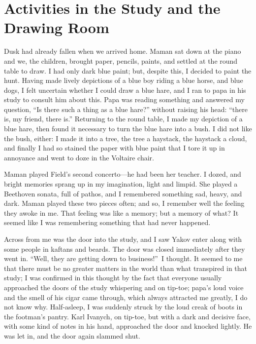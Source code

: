 \chapter{Activities in the Study and the Drawing Room} %

Dusk had already fallen when we arrived home. Maman sat down at the piano and we, the children, brought paper, pencils, paints, and settled at the round table to draw. I had only dark blue paint; but, despite this, I decided to paint the hunt. Having made lively depictions of a blue boy riding a blue horse, and blue dogs, I felt uncertain whether I could draw a blue hare, and I ran to papa in his study to consult him about this. Papa was reading something and answered my question, ``Is there such a thing as a blue hare?'' without raising his head: ``there is, my friend, there is.'' Returning to the round table, I made my depiction of a blue hare, then found it necessary to turn the blue hare into a bush. I did not like the bush, either: I made it into a tree, the tree a haystack, the haystack a cloud, and finally I had so stained the paper with blue paint that I tore it up in annoyance and went to doze in the Voltaire chair.

Maman played Field's second concerto---he had been her teacher. I dozed, and bright memories sprang up in my imagination, light and limpid. She played a Beethoven sonata, full of pathos, and I remembered something sad, heavy, and dark. Maman played these two pieces often; and so, I remember well the feeling they awoke in me. That feeling was like a memory; but a memory of what? It seemed like I was remembering something that had never happened.

 Across from me was the door into the study, and I saw Yakov enter along with some people in kaftans and beards. The door was closed immediately after they went in. ``Well, they are getting down to business!''~I thought. It seemed to me that there must be no greater matters in the world than what transpired in that study; I was confirmed in this thought by the fact that everyone usually approached the doors of the study whispering and on tip-toe; papa's loud voice and the smell of his cigar came through, which always attracted me greatly, I do not know why. Half-asleep, I was suddenly struck by the loud creak of boots in the footman's pantry. Karl Ivanych, on tip-toe, but with a dark and decisive face, with some kind of notes in his hand, approached the door and knocked lightly. He was let in, and the door again slammed shut.

